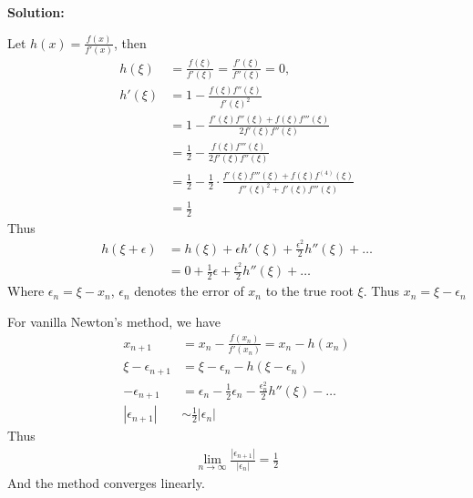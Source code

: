 \documentclass[conference,onecolumn]{IEEEtran}
\begin{document}
\begin{enumerate}[label=\arabic{enumi}.]
\begin{enumerate}
                    \textbf{Solution:}

                    Let $h(x) = \frac{f(x)}{f'(x)}$, then
                    \begin{align*}
                        h(\xi)  & = \frac{f(\xi)}{f'(\xi)} = \frac{f'(\xi)}{f''(\xi)} = 0,                                                      \\
                        h'(\xi) & = 1 - \frac{f(\xi)f''(\xi)}{f'(\xi)^2}                                                                        \\
                                & = 1 - \frac{f'(\xi)f''(\xi) + f(\xi)f'''(\xi)}{2f'(\xi)f''(\xi)}                                              \\
                                & = \frac{1}{2} - \frac{f(\xi)f'''(\xi)}{2f'(\xi)f''(\xi)}                                                      \\
                                & = \frac{1}{2} - \frac{1}{2} \cdot \frac{f'(\xi)f'''(\xi) + f(\xi)f^{(4)}(\xi)}{f''(\xi)^2 + f'(\xi)f'''(\xi)} \\
                                & = \frac{1}{2}
                    \end{align*}
                    Thus
                    \begin{align*}
                        h(\xi + \epsilon) & = h(\xi) + \epsilon h'(\xi) + \frac{\epsilon^2}{2}h''(\xi) + \ldots \\
                                          & = 0 + \frac{1}{2}\epsilon + \frac{\epsilon^2}{2}h''(\xi) + \ldots
                    \end{align*}
                    Where $\epsilon_n = \xi - x_n$, $\epsilon_n$ denotes the error of $x_n$ to the true root $\xi$.
                    Thus $x_n = \xi - \epsilon_n$

                    For vanilla Newton's method, we have
                    \begin{align*}
                        x_{n+1}              & = x_n - \frac{f(x_n)}{f'(x_n)} = x_n - h(x_n)                                  \\
                        \xi - \epsilon_{n+1} & = \xi - \epsilon_n - h(\xi - \epsilon_n)                                       \\
                        - \epsilon_{n+1}     & = \epsilon_n - \frac{1}{2}\epsilon_n - \frac{\epsilon_n^2}{2}h''(\xi) - \ldots \\
                        |\epsilon_{n+1}|     & \sim \frac{1}{2}|\epsilon_n|
                    \end{align*}
                    Thus
                    \begin{align*}
                        \lim_{n \to \infty} \frac{|\epsilon_{n+1}|}{|\epsilon_n|} = \frac{1}{2}
                    \end{align*}
                    And the method converges linearly.


\end{enumerate}
\end{enumerate}
\end{document}
